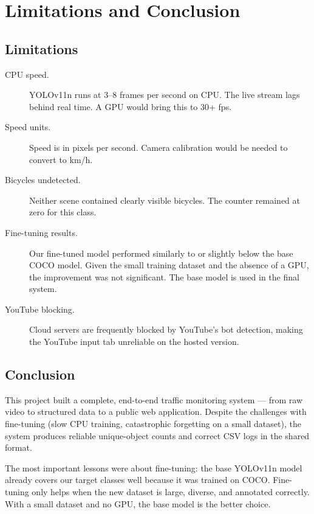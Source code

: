 \documentclass[12pt,a4paper,leqno]{report}
\begin{document}
\chapter{Limitations and Conclusion}

\section{Limitations}

\begin{description}
  \item[CPU speed.] YOLOv11n runs at 3--8 frames per second on CPU. The live stream lags behind real time. A GPU would bring this to 30+ fps.
  \item[Speed units.] Speed is in pixels per second. Camera calibration would be needed to convert to km/h.
  \item[Bicycles undetected.] Neither scene contained clearly visible bicycles. The counter remained at zero for this class.
  \item[Fine-tuning results.] Our fine-tuned model performed similarly to or slightly below the base COCO model. Given the small training dataset and the absence of a GPU, the improvement was not significant. The base model is used in the final system.
  \item[YouTube blocking.] Cloud servers are frequently blocked by YouTube's bot detection, making the YouTube input tab unreliable on the hosted version.
\end{description}

\section{Conclusion}

This project built a complete, end-to-end traffic monitoring system — from raw video to structured data to a public web application. Despite the challenges with fine-tuning (slow CPU training, catastrophic forgetting on a small dataset), the system produces reliable unique-object counts and correct CSV logs in the shared format.

The most important lessons were about fine-tuning: the base YOLOv11n model already covers our target classes well because it was trained on COCO. Fine-tuning only helps when the new dataset is large, diverse, and annotated correctly. With a small dataset and no GPU, the base model is the better choice.
\end{document}
